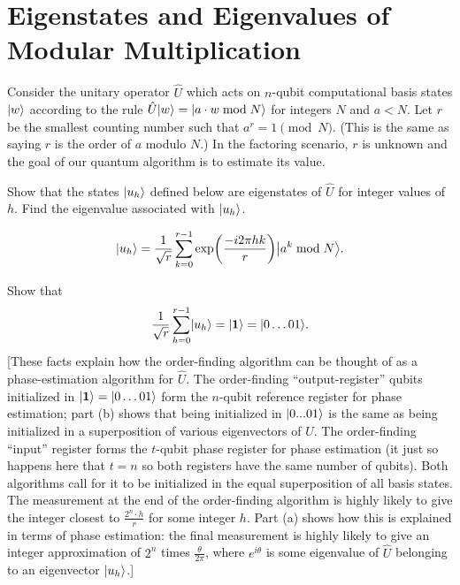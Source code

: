 \documentclass{../phys084}
\author{}
\date{2020 February 25}
\begin{document}
\section{Eigenstates and Eigenvalues of Modular Multiplication}

\begin{exercise}
  Consider the unitary operator \(\hat U\) which acts on \(n\)-qubit
  computational basis states \(\lvert w\rangle\) according to the rule
  \(\hat U \lvert w\rangle = \lvert a \cdot w \bmod N\rangle\) for integers \(N\) and
  \(a<N\).  Let \(r\) be the smallest counting number such that
  \(a^r = 1 \pmod N\).  (This is the same as saying \(r\) is the order
  of \(a\) modulo \(N\).)  In the factoring scenario, \(r\) is unknown
  and the goal of our quantum algorithm is to estimate its value.

  \begin{problems}
  \item Show that the states \(\lvert u_h\rangle\) defined below are
    eigenstates of \(\hat U\) for integer values of \(h\).  Find the
    eigenvalue associated with \(\lvert u_h\rangle\).

    \[
      \ket{u_h} = \frac{1}{\sqrt r} \sum_{k=0}^{r-1}
      \exp \prn*{\frac{-i2\pi h k}{r}} \ket*{a^k \bmod N}.
    \]

  \item Show that
    \[
      \frac{1}{\sqrt r} \sum_{h=0}^{r-1} \lvert u_h\rangle
      = \lvert\mathbf 1\rangle = \lvert0 \dots 01\rangle.
    \]
    [These facts explain how the order-finding algorithm can be
    thought of as a phase-estimation algorithm for \(\hat U\).  The
    order-finding ``output-register'' qubits initialized in
    \(\lvert\mathbf 1\rangle = \lvert0 \dots 01\rangle\) form the \(n\)-qubit
    reference register for phase estimation; part (b) shows that being
    initialized in \(\lvert0...01\rangle\) is the same as being initialized
    in a superposition of various eigenvectors of \(\hat U\).  The
    order-finding ``input'' register forms the \(t\)-qubit phase
    register for phase estimation (it just so happens here that
    \(t=n\) so both registers have the same number of qubits).  Both
    algorithms call for it to be initialized in the equal
    superposition of all basis states.  The measurement at the end of
    the order-finding algorithm is highly likely to give the integer
    closest to \(\frac{2^n \cdot h}{r}\) for some integer \(h\).  Part
    (a) shows how this is explained in terms of phase estimation: the
    final measurement is highly likely to give an integer
    approximation of \(2^n\) times \(\frac{\theta}{2\pi}\), where
    \(e^{i\theta}\) is some eigenvalue of \(\hat U\) belonging to an
    eigenvector \(\lvert u_h\rangle\).]
  \end{problems}
\end{exercise}
\end{document}
